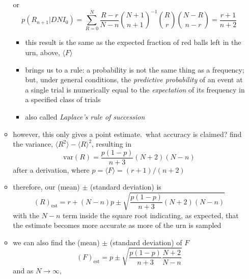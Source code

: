 \documentclass[../jaynes_prob_theory_notes.tex]{subfiles}
\begin{document}
\begin{itemize}
\begin{itemize}
\begin{equation*}
                    \end{equation*}
                    or
                    \begin{equation*}
                        p(R_{n+1}|DNI_0) = \sum^{N}_{R=0} \frac{R-r}{N-n} \binom{N+1}{n+1}^{-1} \binom{R}{r} \binom{N-R}{n-r} = \frac{r+1}{n+2}
                    \end{equation*}
                    \begin{itemize}
                        \item this result is the same as the expected fraction of red balls left in the urn, above, $\langle F \rangle$
                        \item brings us to a rule: a probability is not the same thing as a frequency; but, under general conditions, the \textit{predictive probability} of an event at a single trial is numerically equal to the \textit{expectation} of its frequency in a specified class of trials
                        \item also called \textit{Laplace's rule of succession}
                    \end{itemize}
                \item however, this only gives a point estimate.\ what accuracy is claimed? find the variance, $\langle R^2 \rangle - \langle R \rangle^2$, resulting in
                    \begin{equation*}
                        \mathrm{var}(R) = \frac{p(1-p)}{n+3}(N+2)(N-n)
                    \end{equation*}
                    after a derivation, where $p=\langle F \rangle = (r+1)/(n+2)$
                \item therefore, our (mean) $\pm$ (standard deviation) is
                    \begin{equation*}
                        {(R)}_{\mathrm{est}} = r + (N-n)p \pm \sqrt{\frac{p(1-p)}{n+3} (N+2) (N-n)}
                    \end{equation*}
                    with the $N-n$ term inside the square root indicating, as expected, that the estimate becomes more accurate as more of the urn is sampled
                \item we can also find the (mean) $\pm$ (standard deviation) of $F$
                    \begin{equation*}
                        {(F)}_{\mathrm{est}} = p \pm \sqrt{\frac{p(1-p)}{n+3} \frac{N+2}{N-n}}
                    \end{equation*}
                and as $N \rightarrow \infty$,

\end{itemize}
\end{itemize}
\end{document}
